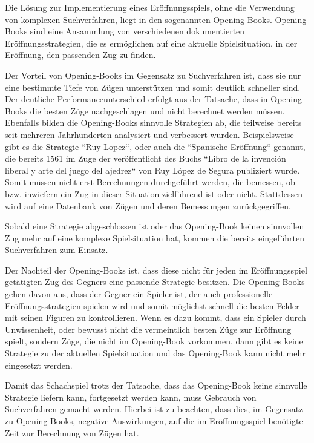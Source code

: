 
Die Lösung zur Implementierung eines Eröffnungsspiels, ohne die Verwendung von komplexen Suchverfahren, liegt in den sogenannten Opening-Books. Opening-Books sind eine Ansammlung von verschiedenen dokumentierten Eröffnungsstrategien, die es ermöglichen auf eine aktuelle Spielsituation, in der Eröffnung, den passenden Zug zu finden.

Der Vorteil von Opening-Books im Gegensatz zu Suchverfahren ist, dass sie nur eine bestimmte Tiefe von Zügen unterstützen und somit deutlich schneller sind. Der deutliche Performanceunterschied erfolgt aus der Tatsache, dass in Opening-Books die besten Züge nachgeschlagen und nicht berechnet werden müssen. Ebenfalls bilden die Opening-Books sinnvolle Strategien ab, die teilweise bereits seit mehreren Jahrhunderten analysiert und verbessert wurden. Beispielsweise gibt es die Strategie ``Ruy Lopez``, oder auch die ``Spanische Eröffnung`` genannt, die bereits 1561 im Zuge der veröffentlicht des Buchs ``Libro de la invención liberal y arte del juego del ajedrez`` von Ruy López de Segura publiziert wurde. Somit müssen nicht erst Berechnungen durchgeführt werden, die bemessen, ob bzw. inwiefern ein Zug in dieser Situation zielführend ist oder nicht. Stattdessen wird auf eine Datenbank von Zügen und deren Bemessungen zurückgegriffen.\cite{Chess.comTeamInternational2018}


Sobald eine Strategie abgeschlossen ist oder das Opening-Book keinen sinnvollen Zug mehr auf eine komplexe Spielsituation hat, kommen die bereits eingeführten Suchverfahren zum Einsatz.

Der Nachteil der Opening-Books ist, dass diese nicht für jeden im Eröffnungsspiel getätigten Zug des Gegners eine passende Strategie besitzen. Die Opening-Books gehen davon aus, dass der Gegner ein Spieler ist, der auch professionelle Eröffnungsstrategien spielen wird und somit möglichst schnell die besten Felder mit seinen Figuren zu kontrollieren. Wenn es dazu kommt, dass ein Spieler durch Unwissenheit, oder bewusst nicht die vermeintlich besten Züge zur Eröffnung spielt, sondern Züge, die nicht im Opening-Book vorkommen, dann gibt es keine Strategie zu der aktuellen Spielsituation und das Opening-Book kann nicht mehr eingesetzt werden. 

Damit das Schachspiel trotz der Tatsache, dass das Opening-Book keine sinnvolle Strategie liefern kann, fortgesetzt werden kann, muss Gebrauch von Suchverfahren gemacht werden. Hierbei ist zu beachten, dass dies, im Gegensatz zu Opening-Books, negative Auswirkungen, auf die im Eröffnungsspiel benötigte Zeit zur Berechnung von Zügen hat.

